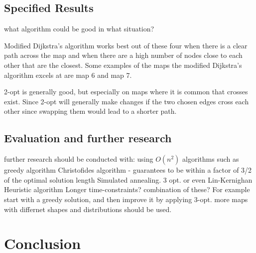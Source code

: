 \documentclass{article}
\begin{document}
\subsection{Specified Results }\label{subsec2}
what algorithm could be good in what situation?

Modified Dijkstra's algorithm works best out of these four when there is a clear path across the map and when there are a high number of nodes close to each other that are the closest. Some examples of the maps the modified Dijkstra's algorithm excels at are map 6 and map 7. 

2-opt is generally good, but especially on maps where it is common that crosses exist. Since 2-opt will generally make changes if the two chosen edges cross each other since swapping them would lead to a shorter path.


\subsection{Evaluation and further research}\label{subsec3}

further research should be conducted with:
using $O(n^2)$ algorithms such as 
greedy algorithm
Christofides algorithm - guarantees to be within a factor of 3/2 of the optimal solution length \cite{Christofides}
Simulated annealing.
3 opt. or even Lin-Kernighan Heuristic algorithm
Longer time-constraints?
combination of these? For example start with a greedy solution, and then improve it by applying 3-opt.
more maps with differnet shapes and distributions should be used.

\section{Conclusion}\label{sec5}






\newpage

 \label{sec6}
\end{document}
